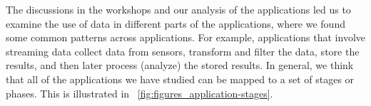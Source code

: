 



The discussions in the workshops and our analysis of the applications
led us to examine the use of data in different parts of the
applications, where we found some common patterns
across applications.  For example, applications that involve
streaming data collect data from sensors, transform and
filter the data, store the results, and then later process (analyze)
the stored results.  In general, we think that all of the applications
we have studied can be mapped to a set of stages or phases.  This is
illustrated in \figurename~\ref{fig:figures_application-stages}.

